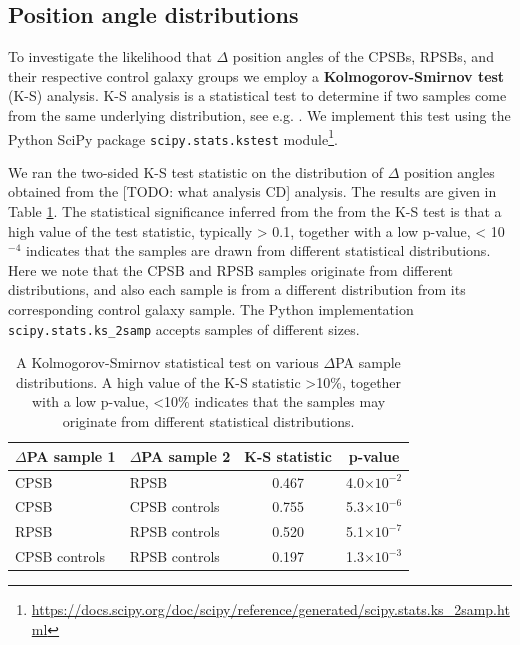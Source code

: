 \subsection{Position angle distributions}
\label{sec:K-S-test}
To investigate the likelihood that $\Delta$ position angles of the CPSBs, RPSBs, and their respective control galaxy groups we employ a \textbf{Kolmogorov-Smirnov test} (K-S) analysis. K-S analysis is a statistical test to determine if two samples come from the same underlying distribution, see e.g. \citet{hodges1958significance}. We implement this test using the Python SciPy package \texttt{scipy.stats.kstest} module\footnote{\href{}{https://docs.scipy.org/doc/scipy/reference/generated/scipy.stats.ks\_2samp.html}}.

We ran the two-sided K-S test statistic on the distribution of $\Delta$ position angles obtained from the [TODO: what analysis CD] analysis. The results are given in Table \ref{tab:K-S-tests}. The statistical significance inferred from the from the K-S test is that a high value of the test statistic, typically > 0.1, together with a low p-value, < 10$^{-4}$ indicates that the samples are drawn from different statistical distributions. Here we note that the CPSB and RPSB samples originate from different distributions, and also each sample is from a different distribution from its corresponding control galaxy sample. The Python implementation \texttt{scipy.stats.ks\_2samp} accepts samples of different sizes.

\begin{table}
\caption[Kolmogorov-Smirnov statistical test of $\Delta$PA distributions]{A Kolmogorov-Smirnov statistical test on various $\Delta$PA sample distributions. A high value of the K-S statistic \textgreater 10\%, together with a low p-value, \textless 10\% indicates that the samples may originate from different statistical distributions.}
\label{tab:K-S-tests}
\begin{tabular}{llcc}
\hline
$\Delta$PA sample 1  & $\Delta$PA sample 2 & K-S statistic & p-value \\
\hline
CPSB & RPSB & 0.467 & 4.0$\times10^{-2}$ \\
CPSB & CPSB controls & 0.755 & 5.3$\times10^{-6}$ \\
RPSB & RPSB controls & 0.520 & 5.1$\times10^{-7}$ \\
CPSB controls & RPSB controls & 0.197 & 1.3$\times10^{-3}$ \\
\hline
\end{tabular}
\end{table}

